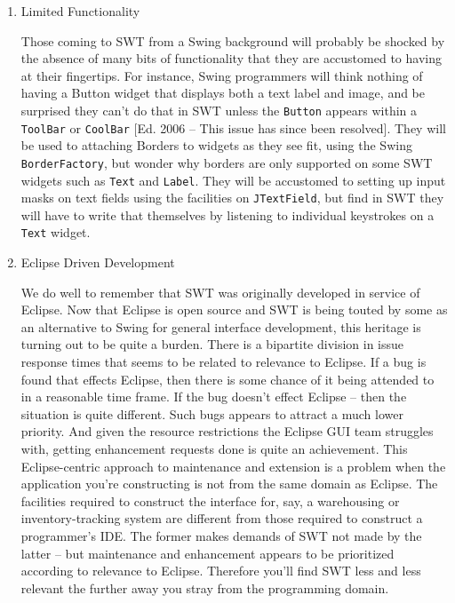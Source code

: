 \documentclass{article}
\begin{document}
\begin{enumerate}
\begin{enumerate}
This problem is an unavoidable byproduct of the architectural decision
that underlies SWT -- the use of native widgets necessitates the
development and maintenance of numerous distinct code bases. The burden
is significant and, to quote James Gosling, "a bad place to be". \footnote{\url{http://www.builderau.com.au/program/work/0,39024650,39176462,00.htm}}

\item Limited Functionality
\label{sec:orgheadline289}

Those coming to SWT from a Swing background will probably be shocked by
the absence of many bits of functionality that they are accustomed to
having at their fingertips. For instance, Swing programmers will think
nothing of having a Button widget that displays both a text label and
image, and be surprised they can't do that in SWT unless the \texttt{Button}
appears within a \texttt{ToolBar} or \texttt{CoolBar} [Ed. 2006 -- This issue has
since been resolved]. They will be used to attaching Borders to widgets
as they see fit, using the Swing \texttt{BorderFactory}, but wonder why borders
are only supported on some SWT widgets such as \texttt{Text} and \texttt{Label}. They
will be accustomed to setting up input masks on text fields using the
facilities on \texttt{JTextField}, but find in SWT they will have to write that
themselves by listening to individual keystrokes on a \texttt{Text} widget.

\item Eclipse Driven Development
\label{sec:orgheadline290}

We do well to remember that SWT was originally developed in service of
Eclipse. Now that Eclipse is open source and SWT is being touted by some
as an alternative to Swing for general interface development, this
heritage is turning out to be quite a burden. There is a bipartite
division in issue response times that seems to be related to relevance
to Eclipse. If a bug is found that effects Eclipse, then there is some
chance of it being attended to in a reasonable time frame. If the bug
doesn't effect Eclipse -- then the situation is quite different. Such
bugs appears to attract a much lower priority. And given the resource
restrictions the Eclipse GUI team struggles with, getting enhancement
requests done is quite an achievement. This Eclipse-centric approach to
maintenance and extension is a problem when the application you're
constructing is not from the same domain as Eclipse. The facilities
required to construct the interface for, say, a warehousing or
inventory-tracking system are different from those required to construct
a programmer's IDE. The former makes demands of SWT not made by the
latter -- but maintenance and enhancement appears to be prioritized
according to relevance to Eclipse. Therefore you'll find SWT less and
less relevant the further away you stray from the programming domain.
\end{enumerate}


\end{enumerate}
\end{document}
